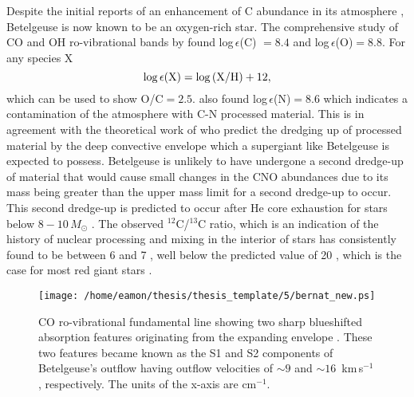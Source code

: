 Despite the initial reports of an enhancement of C abundance in its atmosphere \citep{spinrad_1966}, Betelgeuse is now known to be an oxygen-rich star. The comprehensive study of CO and OH ro-vibrational bands by \cite{lambert_1984} found log\,$\epsilon$(C) $ = 8.4$ and log\,$\epsilon$(O)$ = 8.8$. For any species X
\begin{equation}
\rm{log}\,\epsilon(X)=\rm{log}\,(X/H)+12,
\end{equation}
which can be used to show O/C$ = 2.5$. \cite{lambert_1984} also found log\,$\epsilon$(N)$ = 8.6$ which indicates a contamination of the atmosphere with C-N processed material. This is in agreement with the theoretical work of \cite{lamb_1976} who predict the dredging up of processed material by the deep convective envelope which a supergiant like Betelgeuse is expected to possess. Betelgeuse is unlikely to have undergone a second dredge-up of material that would cause small changes in the CNO abundances due to its mass being greater than the upper mass limit for a second dredge-up to occur.  This second dredge-up is predicted to occur after He core exhaustion for stars below $8-10 \,M_{\odot}$ \citep{kaler_1978}. The observed $^{12}$C/$^{13}$C ratio, which is an indication of the history of nuclear processing and mixing in the interior of stars \citep{pavlenko_2003,eggleton_2007} has consistently found to be between 6 and 7 \citep{lambert_1974,hinkle_1976,bernat_1979,harris_1984}, well below the predicted value of 20 \citep{charbonnel_1995,pavlenko_2003}, which is the case for most red giant stars \citep[e.g.,][]{boothroyd_1999}.

\begin{figure}[!ht]
\centering 
          \texttt{[image: /home/eamon/thesis/thesis\_template/5/bernat\_new.ps]}
\caption[Bernat (1979) CO line profile showing two sharp line cores.]{CO ro-vibrational fundamental line showing two sharp blueshifted absorption features originating from the expanding envelope \citep{bernat_1979}. These two features became known as the S1 and S2 components of Betelgeuse's outflow having outflow velocities of $\sim 9$ and $\sim 16$\, km\,s$^{-1}$, respectively. The units of the x-axis are cm$^{-1}$.}
\label{fig:5.1}
\end{figure}

